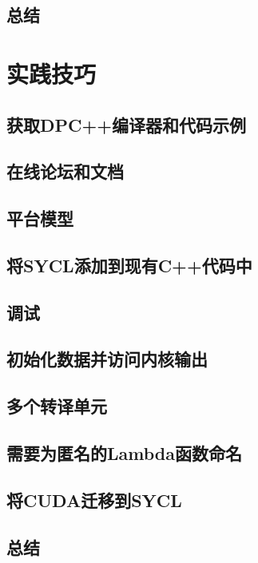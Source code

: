 \documentclass[11pt,a4paper,UTF8]{ctexart}
\begin{document}
		\subsection{总结}
		
	\section{实践技巧}
	
		\subsection{获取DPC++编译器和代码示例}
		
		\subsection{在线论坛和文档}
		
		\subsection{平台模型}
		
		\subsection{将SYCL添加到现有C++代码中}
		
		\subsection{调试}
		
		\subsection{初始化数据并访问内核输出}
		
		\subsection{多个转译单元}
		
		\subsection{需要为匿名的Lambda函数命名}
		
		\subsection{将CUDA迁移到SYCL}
		
		\subsection{总结}
		
\end{document}
